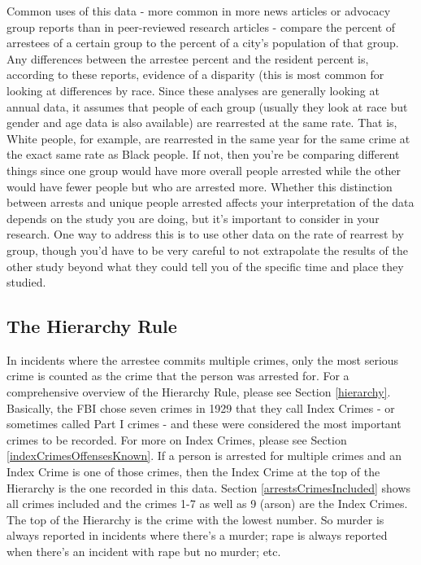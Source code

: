 \documentclass[
  12pt,
  openany]{book}
\begin{document}
Common uses of this data - more common in more news articles or advocacy group reports than in peer-reviewed research articles - compare the percent of arrestees of a certain group to the percent of a city's population of that group. Any differences between the arrestee percent and the resident percent is, according to these reports, evidence of a disparity (this is most common for looking at differences by race. Since these analyses are generally looking at annual data, it assumes that people of each group (usually they look at race but gender and age data is also available) are rearrested at the same rate. That is, White people, for example, are rearrested in the same year for the same crime at the exact same rate as Black people. If not, then you're be comparing different things since one group would have more overall people arrested while the other would have fewer people but who are arrested more. Whether this distinction between arrests and unique people arrested affects your interpretation of the data depends on the study you are doing, but it's important to consider in your research. One way to address this is to use other data on the rate of rearrest by group, though you'd have to be very careful to not extrapolate the results of the other study beyond what they could tell you of the specific time and place they studied.

\hypertarget{the-hierarchy-rule}{%
\subsection{The Hierarchy Rule}\label{the-hierarchy-rule}}

In incidents where the arrestee commits multiple crimes, only the most serious crime is counted as the crime that the person was arrested for. For a comprehensive overview of the Hierarchy Rule, please see Section \ref{hierarchy}. Basically, the FBI chose seven crimes in 1929 that they call Index Crimes - or sometimes called Part I crimes - and these were considered the most important crimes to be recorded. For more on Index Crimes, please see Section \ref{indexCrimesOffensesKnown}. If a person is arrested for multiple crimes and an Index Crime is one of those crimes, then the Index Crime at the top of the Hierarchy is the one recorded in this data. Section \ref{arrestsCrimesIncluded} shows all crimes included and the crimes 1-7 as well as 9 (arson) are the Index Crimes. The top of the Hierarchy is the crime with the lowest number. So murder is always reported in incidents where there's a murder; rape is always reported when there's an incident with rape but no murder; etc.
\end{document}
